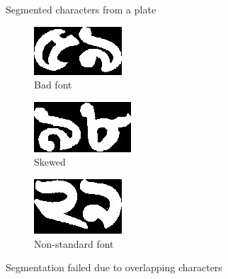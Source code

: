 \begin{figure}
\begin{subfigure}{0.09\textwidth}
\end{subfigure}
\caption{Segmented characters from a plate}
\label{fig:SegmentResult1}
\end{figure}


\begin{figure}
\begin{subfigure}{0.33\textwidth}
    \centering
    \includegraphics[width=0.9\linewidth]{./img/experiment/stage.17/06-00-00-badfont}
    \caption{Bad font}
\end{subfigure}
\begin{subfigure}{0.33\textwidth}
    \centering
    \includegraphics[width=0.9\linewidth]{./img/experiment/stage.17/07-01-00-private2}
    \caption{Skewed}
\end{subfigure}
\begin{subfigure}{0.33\textwidth}
    \centering
    \includegraphics[width=0.9\linewidth]{./img/experiment/stage.17/06-01-02-private}
    \caption{Non-standard font}
\end{subfigure}
\caption{Segmentation failed due to overlapping characters}
\label{fig:OverlappingChar}
\end{figure}


